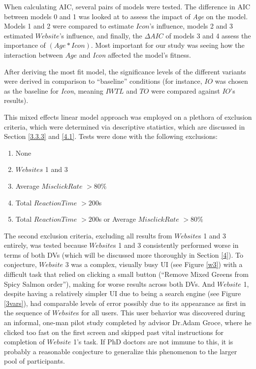 \documentclass[12pt,twoside]{reedthesis}
\begin{document}
    When calculating AIC, several pairs of models were tested. The difference in AIC between models 0 and 1 was looked at to assess the impact of \textit{Age} on the model. Models 1 and 2 were compared to estimate $Icon$'s influence, models 2 and 3 estimated $Website$'s influence, and finally, the $\Delta AIC$ of models 3 and 4 assess the importance of $(Age*Icon)$. Most important for our study was seeing how the interaction between $Age$ and \textit{Icon} affected the model's fitness. 

    After deriving the most fit model, the significance levels of the different variants were derived in comparison to \enquote{baseline} conditions (for instance, $IO$ was chosen as the baseline for \textit{Icon}, meaning $IWTL$ and $TO$ were compared against $IO$'s results). 
 
    This mixed effects linear model approach was employed on a plethora of exclusion criteria, which were determined via descriptive statistics, which are discussed in Section \ref{3.3.3} and \ref{4.1}. Tests were done with the following exclusions:
    
    \begin{enumerate}
        \item None
        \item $Websites$ 1 and 3
        \item Average $MisclickRate$ $>80\%$
        \item Total $ReactionTime$ $>200$s
        \item Total $ReactionTime$ $>200$s or Average $MisclickRate$ $>80\%$
    \end{enumerate}

    The second exclusion criteria, excluding all results from $Website$s 1 and 3 entirely, was tested because $Website$s 1 and 3 consistently performed worse in terms of both DVs (which will be discussed more thoroughly in Section \ref{4}). To conjecture, $Website$ 3 was a complex, visually busy UI (see Figure \ref{w3}) with a difficult task that relied on clicking a small button (\enquote{Remove Mixed Greens from Spicy Salmon order}), making for worse results across both DVs. And $Website$ 1, despite having a relatively simpler UI due to being a search engine (see Figure \ref{3vars}), had comparable levels of error possibly due to its appearance as first in the sequence of $Website$s for all users. This user behavior was discovered during an informal, one-man pilot study completed by advisor Dr.\@ Adam Groce, where he clicked too fast on the first screen and skipped past vital instructions for completion of $Website$ 1's task. If PhD doctors are not immune to this, it is probably a reasonable conjecture to generalize this phenomenon to the larger pool of participants.
        
\end{document}
